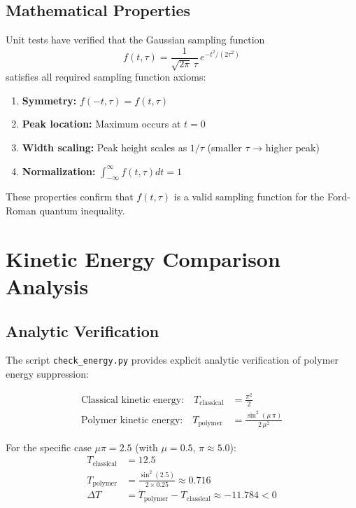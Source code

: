 \documentclass[11pt]{article}
\begin{document}
\subsection{Mathematical Properties}
Unit tests have verified that the Gaussian sampling function
\begin{equation}
f(t,\tau) = \frac{1}{\sqrt{2\pi}\,\tau}\,e^{-t^2/(2\tau^2)}
\end{equation}
satisfies all required sampling function axioms:

\begin{enumerate}
\item \textbf{Symmetry:} $f(-t,\tau) = f(t,\tau)$ 
\item \textbf{Peak location:} Maximum occurs at $t = 0$
\item \textbf{Width scaling:} Peak height scales as $1/\tau$ (smaller $\tau$ → higher peak)
\item \textbf{Normalization:} $\int_{-\infty}^{\infty} f(t,\tau) dt = 1$
\end{enumerate}

These properties confirm that $f(t,\tau)$ is a valid sampling function for the Ford-Roman quantum inequality.

\section{Kinetic Energy Comparison Analysis}

\subsection{Analytic Verification}
The script \texttt{check\_energy.py} provides explicit analytic verification of polymer energy suppression:

\begin{align}
\text{Classical kinetic energy:} \quad T_{\text{classical}} &= \frac{\pi^2}{2} \\
\text{Polymer kinetic energy:} \quad T_{\text{polymer}} &= \frac{\sin^2(\mu\,\pi)}{2\,\mu^2}
\end{align}

For the specific case $\mu\pi = 2.5$ (with $\mu = 0.5$, $\pi \approx 5.0$):
\begin{align}
T_{\text{classical}} &= 12.5 \\
T_{\text{polymer}} &= \frac{\sin^2(2.5)}{2 \times 0.25} \approx 0.716 \\
\Delta T &= T_{\text{polymer}} - T_{\text{classical}} \approx -11.784 < 0
\end{align}
\end{document}
